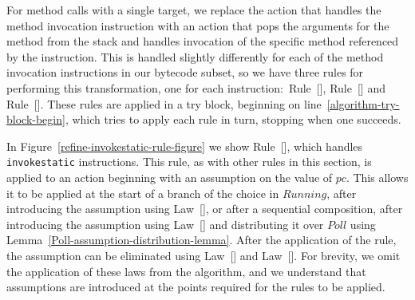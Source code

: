 For method calls with a single target, we replace the action that
handles the method invocation instruction with an action that pops the
arguments for the method from the stack and handles invocation of the
specific method referenced by the instruction.
This is handled slightly differently for each of the method invocation
instructions in our bytecode subset, so we have three rules for
performing this transformation, one for each
instruction:~Rule~[],
Rule~[] and
Rule~[].
These rules are applied in a try block, beginning on
line~\ref{algorithm-try-block-begin}, which tries to apply each rule in
turn, stopping when one succeeds.

In Figure~\ref{refine-invokestatic-rule-figure} we show
Rule~[], which handles
\texttt{invokestatic} instructions.
This rule, as with other rules in this section, is applied to an
action beginning with an assumption on the value of $pc$.
This allows it to be applied at the start of a branch of the choice in
$Running$, after introducing the assumption using
Law~[], or after a sequential
composition, after introducing the assumption using
Law~[] and distributing it over
$Poll$ using Lemma~\ref{Poll-assumption-distribution-lemma}.
After the application of the rule, the assumption can be eliminated
using Law~[] and
Law~[].
For brevity, we omit the application of these laws from the algorithm,
and we understand that assumptions are introduced at the points
required for the rules to be applied.

